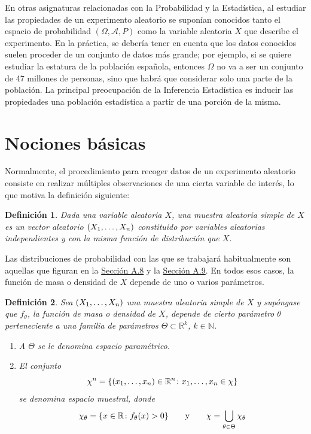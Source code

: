 \documentclass[11pt]{report}
\newtheorem{definition}{Definición}
\theoremstyle{definition}
\newcommand{\R}{\mathbb R}
\newcommand{\N}{\mathbb N}
\begin{document}
En otras asignaturas relacionadas con la Probabilidad y la Estadística, al estudiar las propiedades de un experimento aleatorio se suponían conocidos tanto el espacio de probabilidad $(\Omega,\mathcal{A},P)$ como la variable aleatoria $X$ que describe el experimento. En la práctica, se debería tener en cuenta que los datos conocidos suelen proceder de un conjunto de datos más grande; por ejemplo, si se quiere estudiar la estatura de la población española, entonces $\Omega$ no va a ser un conjunto de 47 millones de personas, sino que habrá que considerar solo una parte de la población. La principal preocupación de la Inferencia Estadística es inducir las propiedades una población estadística a partir de una porción de la misma.

\section{Nociones básicas}

Normalmente, el procedimiento para recoger datos de un experimento aleatorio consiste en realizar múltiples observaciones de una cierta variable de interés, lo que motiva la definición siguiente:

\begin{definition}
Dada una variable aleatoria $X$, una \emph{muestra aleatoria simple de $X$} es un vector aleatorio $(X_1,\mathellipsis,X_n)$ constituido por variables aleatorias independientes y con la misma función de distribución que $X$. 
\end{definition}

Las distribuciones de probabilidad con las que se trabajará habitualmente son aquellas que figuran en la \hyperref[A.8]{\color{Blue}Sección A.8} y la \hyperref[A.9]{\color{Blue}Sección A.9}. 
En todos esos casos, la función de masa o densidad de $X$ depende de uno o varios parámetros.

\begin{definition}
Sea $(X_1,\mathellipsis,X_n)$ una muestra aleatoria simple de $X$ y supóngase que $f_\theta$, la función de masa o densidad de $X$, depende de cierto parámetro $\theta$ perteneciente a una familia de parámetros $\Theta \subset \R^k$, $k \in \N$.
\begin{enumerate}
    \item A $\Theta$ se le denomina \emph{espacio paramétrico}.
    \item El conjunto
    \[\chi^n = \{(x_1,\mathellipsis,x_n) \in \R^n \colon x_1,\mathellipsis,x_n \in \chi\}\]
    se denomina \emph{espacio muestral}, donde
    \[\chi_\theta = \{x \in \R \colon f_\theta(x)>0\} \qquad \textup{y} \qquad \chi = \bigcup_{\theta \in \Theta} \chi_\theta\]
\end{enumerate}
\end{definition}
\end{document}
